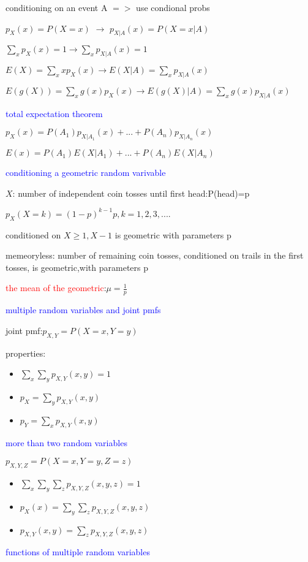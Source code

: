 conditioning on an event A $=>$ use condional probs

$p_X(x)=P(X=x)$    $\rightarrow$    $p_{X|A}(x)=P(X=x|A)$

$\sum_xp_X(x)=1\rightarrow \sum_xp_{X|A}(x)=1$

$E(X)=\sum_xxp_X(x)\rightarrow E(X|A)=\sum_xp_{X|A}(x)$

$E(g(X))=\sum_xg(x)p_X(x)\rightarrow E(g(X)|A)=\sum_xg(x)p_{X|A}(x)$


\textcolor{blue}{total expectation theorem}

$p_X(x)=P(A_1)p_{X|A_1}(x)+...+P(A_n)p_{X|A_n}(x)$

$E(x)=P(A_1)E(X|A_1)+...+P(A_n)E(X|A_n)$

\textcolor{blue}{conditioning a geometric random varivable}

$X$: number of independent coin tosses until first head:P(head)=p

$p_X(X=k)=(1-p)^{k-1}p,k=1,2,3,....$

conditioned on $X\ge 1,X-1$ is geometric with parameters p 

memeoryless: number of remaining coin tosses, conditioned on trails in the first tosses, is geometric,with parameters p 


\textcolor{red}{the mean of the geometric}:$\mu=\frac{1}{p}$

\textcolor{blue}{multiple random variables and joint pmfs}

joint pmf:$p_{X,Y}=P(X=x,Y=y)$

properties:
\begin{itemize}
    \item $\sum_x\sum_y p_{X,Y}(x,y)=1$
    \item $p_X=\sum_y p_{X,Y}(x,y)$
    \item $p_Y=\sum_x p_{X,Y}(x,y)$
\end{itemize}


\textcolor{blue}{more than two random variables}

$p_{X,Y,Z}=P(X=x,Y=y,Z=z)$
\begin{itemize}
    \item $\sum_x \sum_y\sum_z p_{X,Y,Z}(x,y,z)=1$
    \item $p_X(x)=\sum_y\sum_z p_{X,Y,Z}(x,y,z)$
    \item $p_{X,Y}(x,y)=\sum_zp_{X,Y,Z}(x,y,z)$
\end{itemize}

\textcolor{blue}{functions of multiple random variables}


